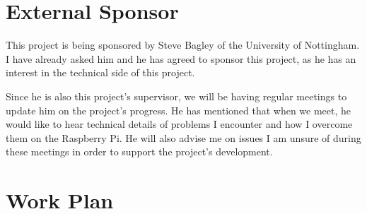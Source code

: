 \documentclass{article}
\begin{document}
\section{External Sponsor}
This project is being sponsored by Steve Bagley of the University of
Nottingham. I have already asked him and he has agreed to sponsor this project,
as he has an interest in the technical side of this project.

Since he is also this project's supervisor, we will be having regular meetings
to update him on the project's progress. He has mentioned that when we meet, he
would like to hear technical details of problems I encounter and how I overcome
them on the Raspberry Pi. He will also advise me on issues I am unsure of
during these meetings in order to support the project's development.

\section{Work Plan}
\end{document}
